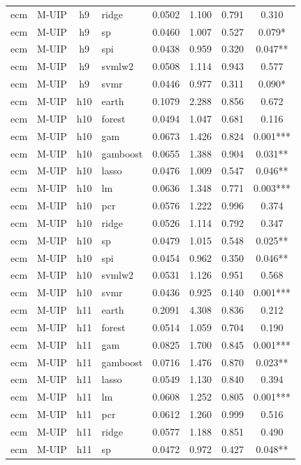 \begin{ThreePartTable}
\begin{longtable}[t]{llclcccc}
ecm & M-UIP & h9 & ridge & 0.0502 & 1.100 & 0.791 & 0.310\\
ecm & M-UIP & h9 & sp & 0.0460 & 1.007 & 0.527 & 0.079*\\
ecm & M-UIP & h9 & spi & 0.0438 & 0.959 & 0.320 & 0.047**\\
ecm & M-UIP & h9 & svmlw2 & 0.0508 & 1.114 & 0.943 & 0.577\\
ecm & M-UIP & h9 & svmr & 0.0446 & 0.977 & 0.311 & 0.090*\\
\addlinespace
ecm & M-UIP & h10 & earth & 0.1079 & 2.288 & 0.856 & 0.672\\
ecm & M-UIP & h10 & forest & 0.0494 & 1.047 & 0.681 & 0.116\\
ecm & M-UIP & h10 & gam & 0.0673 & 1.426 & 0.824 & 0.001***\\
ecm & M-UIP & h10 & gamboost & 0.0655 & 1.388 & 0.904 & 0.031**\\
ecm & M-UIP & h10 & lasso & 0.0476 & 1.009 & 0.547 & 0.046**\\
ecm & M-UIP & h10 & lm & 0.0636 & 1.348 & 0.771 & 0.003***\\
ecm & M-UIP & h10 & pcr & 0.0576 & 1.222 & 0.996 & 0.374\\
ecm & M-UIP & h10 & ridge & 0.0526 & 1.114 & 0.792 & 0.347\\
ecm & M-UIP & h10 & sp & 0.0479 & 1.015 & 0.548 & 0.025**\\
ecm & M-UIP & h10 & spi & 0.0454 & 0.962 & 0.350 & 0.046**\\
ecm & M-UIP & h10 & svmlw2 & 0.0531 & 1.126 & 0.951 & 0.568\\
ecm & M-UIP & h10 & svmr & 0.0436 & 0.925 & 0.140 & 0.001***\\
\addlinespace
ecm & M-UIP & h11 & earth & 0.2091 & 4.308 & 0.836 & 0.212\\
ecm & M-UIP & h11 & forest & 0.0514 & 1.059 & 0.704 & 0.190\\
ecm & M-UIP & h11 & gam & 0.0825 & 1.700 & 0.845 & 0.001***\\
ecm & M-UIP & h11 & gamboost & 0.0716 & 1.476 & 0.870 & 0.023**\\
ecm & M-UIP & h11 & lasso & 0.0549 & 1.130 & 0.840 & 0.394\\
ecm & M-UIP & h11 & lm & 0.0608 & 1.252 & 0.805 & 0.001***\\
ecm & M-UIP & h11 & pcr & 0.0612 & 1.260 & 0.999 & 0.516\\
ecm & M-UIP & h11 & ridge & 0.0577 & 1.188 & 0.851 & 0.490\\
ecm & M-UIP & h11 & sp & 0.0472 & 0.972 & 0.427 & 0.048**\\

\end{longtable}
\end{ThreePartTable}
